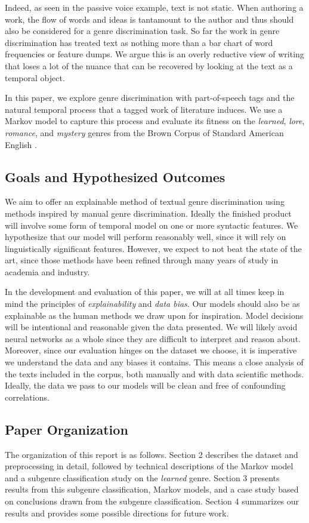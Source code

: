 \documentclass{article}
\begin{document}
Indeed, as seen in the passive voice example, text is not static. When authoring a work, the flow of words and ideas is tantamount to the author and thus should also be considered for a genre discrimination task. So far the work in genre discrimination has treated text as nothing more than a bar chart of word frequencies or feature dumps. We argue this is an overly reductive view of writing that loses a lot of the nuance that can be recovered by looking at the text as a temporal object.

In this paper, we explore genre discrimination with part-of-speech tags and the natural temporal process that a tagged work of literature induces. We use a Markov model to capture this process and evaluate its fitness on the \textit{learned}, \textit{lore}, \textit{romance}, and \textit{mystery} genres from the Brown Corpus of Standard American English \cite{Brown} \cite{BrownManual}.

\subsection{Goals and Hypothesized Outcomes}
We aim to offer an explainable method of textual genre discrimination using methods inspired by manual genre discrimination. Ideally the finished product will involve some form of temporal model on one or more syntactic features. We hypothesize that our model will perform reasonably well, since it will rely on linguistically significant features. However, we expect to not beat the state of the art, since those methods have been refined through many years of study in academia and industry.

In the development and evaluation of this paper, we will at all times keep in mind the principles of \textit{explainability} and \textit{data bias}. Our models should also be as explainable as the human methods we draw upon for inspiration. Model decisions will be intentional and reasonable given the data presented. We will likely avoid neural networks as a whole since they are difficult to interpret and reason about. Moreover, since our evaluation hinges on the dataset we choose, it is imperative we understand the data and any biases it contains. This means a close analysis of the texts included in the corpus, both manually and with data scientific methods. Ideally, the data we pass to our models will be clean and free of confounding correlations.

\subsection{Paper Organization}
The organization of this report is as follows. Section 2 describes the dataset and preprocessing in detail, followed by technical descriptions of the Markov model and a subgenre classification study on the \textit{learned} genre. Section 3 presents results from this subgenre classification, Markov models, and a case study based on conclusions drawn from the subgenre classification. Section 4 summarizes our results and provides some possible directions for future work.
\end{document}
